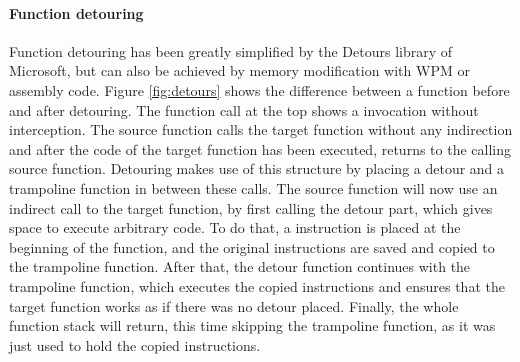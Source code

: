 \paragraph{Function detouring}

Function detouring has been greatly simplified by the Detours\cite{msdetours} library of Microsoft, but can also be achieved by memory modification with \gls{WPM} or assembly code. Figure \ref{fig:detours} shows the difference between a function before and after detouring. The function call at the top shows a invocation without interception. The source function calls the target function without any indirection and after the code of the target function has been executed, returns to the calling source function. Detouring makes use of this structure by placing a detour and a trampoline function in between these calls. The source function will now use an indirect call to the target function, by first calling the detour part, which gives space to execute arbitrary code. To do that, a  instruction is placed at the beginning of the function, and the original instructions are saved and copied to the trampoline function. After that, the detour function continues with the trampoline function, which executes the copied instructions and ensures that the target function works as if there was no detour placed. Finally, the whole function stack will return, this time skipping the trampoline function, as it was just used to hold the copied instructions.